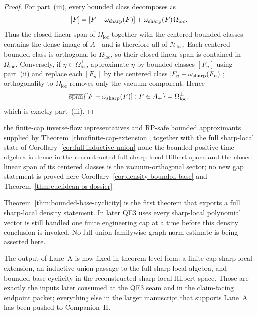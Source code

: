 \begin{proof}
For part~\textup{(iii)}, every bounded class decomposes as
\[
[F]=[F-\omega_{\mathrm{sharp}}(F)] + \omega_{\mathrm{sharp}}(F)\,\Omega_{\mathrm{loc}}.
\]
Thus the closed linear span of $\Omega_{\mathrm{loc}}$ together with the centered bounded classes contains the dense image of $A_+$ and is therefore all of $\mathcal H_{\mathrm{loc}}$. Each centered bounded class is orthogonal to $\Omega_{\mathrm{loc}}$, so their closed linear span is contained in $\Omega_{\mathrm{loc}}^{\perp}$. Conversely, if $\eta\in\Omega_{\mathrm{loc}}^{\perp}$, approximate $\eta$ by bounded classes $[F_n]$ using part~\textup{(ii)} and replace each $[F_n]$ by the centered class $[F_n-\omega_{\mathrm{sharp}}(F_n)]$; orthogonality to $\Omega_{\mathrm{loc}}$ removes only the vacuum component. Hence
\[
\overline{\operatorname{span}}\{[F-\omega_{\mathrm{sharp}}(F)]:F\in A_+\}=\Omega_{\mathrm{loc}}^{\perp},
\]
which is exactly part~\textup{(iii)}.
\end{proof}

\dependencyledger
  {the finite-cap inverse-flow representatives and RP-safe bounded approximants supplied by Theorem~\ref{thm:finite-cap-extension}, together with the full sharp-local state of Corollary~\ref{cor:full-inductive-union}}
  {none}
  {the bounded positive-time algebra is dense in the reconstructed full sharp-local Hilbert space and the closed linear span of its centered classes is the vacuum-orthogonal sector; no new gap statement is proved here}
  {Corollary~\ref{cor:density-bounded-base} and Theorem~\ref{thm:euclidean-os-dossier}}
\begin{remark}
Theorem~\ref{thm:bounded-base-cyclicity} is the first theorem that exports a full sharp-local density statement. In later QE3 uses every sharp-local polynomial vector is still handled one finite engineering cap at a time before this density conclusion is invoked. No full-union familywise graph-norm estimate is being asserted here.
\end{remark}


The output of Lane~A is now fixed in theorem-level form: a finite-cap sharp-local extension, an inductive-union passage to the full sharp-local algebra, and bounded-base cyclicity in the reconstructed sharp-local Hilbert space. Those are exactly the inputs later consumed at the QE3 seam and in the claim-facing endpoint packet; everything else in the larger manuscript that supports Lane~A has been pushed to Companion~II.
